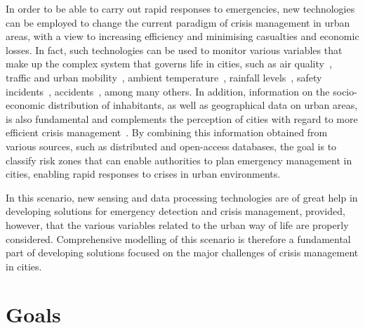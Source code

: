 \begin{refsection}
In order to be able to carry out rapid responses to emergencies, new technologies can be employed to change the current paradigm of crisis management in urban areas, with a view to increasing efficiency and minimising casualties and economic losses. In fact, such technologies can be used to monitor various variables that make up the complex system that governs life in cities, such as air quality~\cite{Silva_2019}, traffic and urban mobility~\cite{Calderoni_2014}, ambient temperature~\cite{silva2020climifba}, rainfall levels~\cite{Xu_2016}, safety incidents~\cite{Alkhatib2019771}, accidents~\cite{Thompson_2010}, among many others. In addition, information on the socio-economic distribution of inhabitants, as well as geographical data on urban areas, is also fundamental and complements the perception of cities with regard to more efficient crisis management~\cite{KONTOKOSTA2018272}. By combining this information obtained from various sources, such as distributed and open-access databases, the goal is to classify risk zones that can enable authorities to plan emergency management in cities, enabling rapid responses to crises in urban environments.


In this scenario, new sensing and data processing technologies are of great help in developing solutions for emergency detection and crisis management, provided, however, that the various variables related to the urban way of life are properly considered. Comprehensive modelling of this scenario is therefore a fundamental part of developing solutions focused on the major challenges of crisis management in cities.

\section{Goals}\label{sec:objetivos}



\end{refsection}
